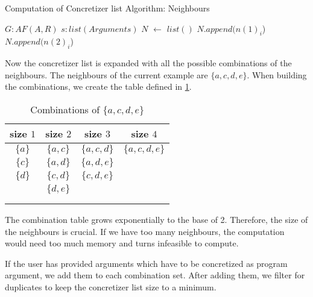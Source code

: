 \begin{algorithm}
    \caption{Computation of Concretizer list Algorithm: Neighbours}\label{alg:concretizerListNeighbours}
    \begin{algorithmic}[1]
        \Require $G: AF(A, R)$ 
        \Require $s: list(Arguments)$ 
        \State $N$ $\gets$ $list()$ 
         
             
                 
                    \State $N.append(n(1)_i$)
                    \State $N.append(n(2)_i$)
                \EndFor
            \EndFor
        \EndFor
    \end{algorithmic}
\end{algorithm}


Now the concretizer list is expanded with all the possible combinations of the neighbours. The neighbours of the current example are $\{a, c, d, e\}$. When building the combinations, we create the table defined in \cref{table:algorithmConcretizer1}.

\begin{table}[htb]
    \centering
    \caption{Combinations of $\{a, c, d, e\}$}
    \begin{tabular}{ |c|c|c|c| }
     \hline
     size $1$ & size $2$ & size $3$ & size $4$\\
     \hline
     \hline
     $\{a\}$ & $\{a, c\}$ & $\{a, c, d\}$ &$\{a, c, d, e\}$ \\
     \hline
     $\{c\}$ & $\{a, d\}$ & $\{a, d, e\}$ & \\
     \hline
     $\{d\}$ & $\{c, d\}$ & $\{c, d, e\}$ & \\
     \hline
      & $\{d, e\}$ &  & \\
     \hline
       &  &  & \\
     \hline
       &  &  & \\
     \hline
    \end{tabular}
\label{table:algorithmConcretizer1}
\end{table}

The combination table grows exponentially to the base of 2. Therefore, the size of the neighbours is crucial. If we have too many neighbours, the computation would need too much memory and turns infeasible to compute.

If the user has provided arguments which have to be concretized as program argument, we add them to each combination set. After adding them, we filter for duplicates to keep the concretizer list size to a minimum.

